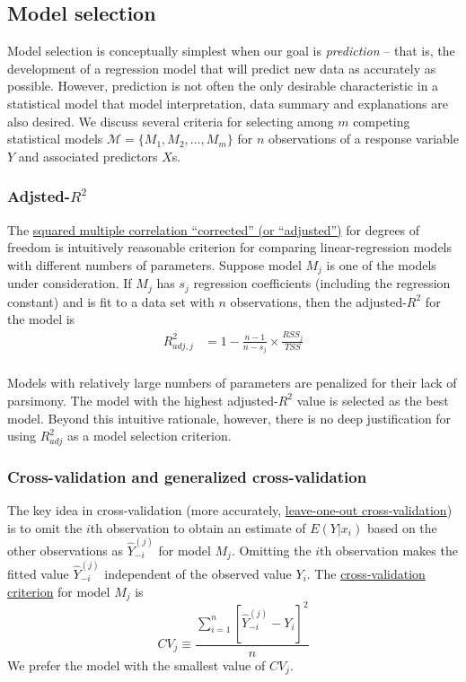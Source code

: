 \newpage
\subsection*{Model selection}

Model selection is conceptually simplest when our goal is {\it prediction} -- that is, the development of a regression model that will predict new data as accurately as possible.  
However, prediction is not often the only desirable characteristic in a statistical model that model interpretation, data summary and explanations are also desired.
We discuss several criteria for selecting among $m$ competing statistical models $\mathcal{M} = \{M_1, M_2, \dots, M_m\}$ for $n$ observations of a response variable $Y$ and associated predictors $X$s.

\subsubsection*{Adjsted-$R^2$}

The \underline{squared multiple correlation ``corrected'' (or ``adjusted'')} for degrees of freedom is intuitively reasonable criterion for comparing linear-regression models with different numbers of parameters.
Suppose model $M_j$ is one of the models under consideration.
If $M_j$ has $s_j$ regression coefficients (including the regression constant) and is fit to a data set with $n$ observations,
then the adjusted-$R^2$ for the model is
$$
\begin{aligned}
	R^2_{adj, j} &= 1 - \frac{n - 1}{n - s_j} \times \frac{RSS_j}{TSS}\\
\end{aligned}
$$

Models with relatively large numbers of parameters are penalized for their lack of parsimony.
The model with the highest adjusted-$R^2$ value is selected as the best model.
Beyond this intuitive rationale, however, there is no deep justification for using $R_{adj}^2$ as a model selection criterion.

\subsubsection*{Cross-validation and generalized cross-validation}
The key idea in cross-validation (more accurately, \underline{leave-one-out cross-validation}) is to omit the $i$th observation to obtain an estimate of $E(Y|x_i)$ based on the other observations as $\hat{Y}_{-i}^{(j)}$ for model $M_j$.  Omitting the $i$th observation makes the fitted value $\hat{Y}_{-i}^{(j)}$ independent of the observed value $Y_i$.  The \underline{cross-validation criterion} for model $M_j$ is
$$
CV_j \equiv \frac{\sum_{i = 1}^n \left[ \hat{Y}_{-i}^{(j)} - Y_i\right]^2}{n}
$$
We prefer the model with the smallest value of $CV_j$.

